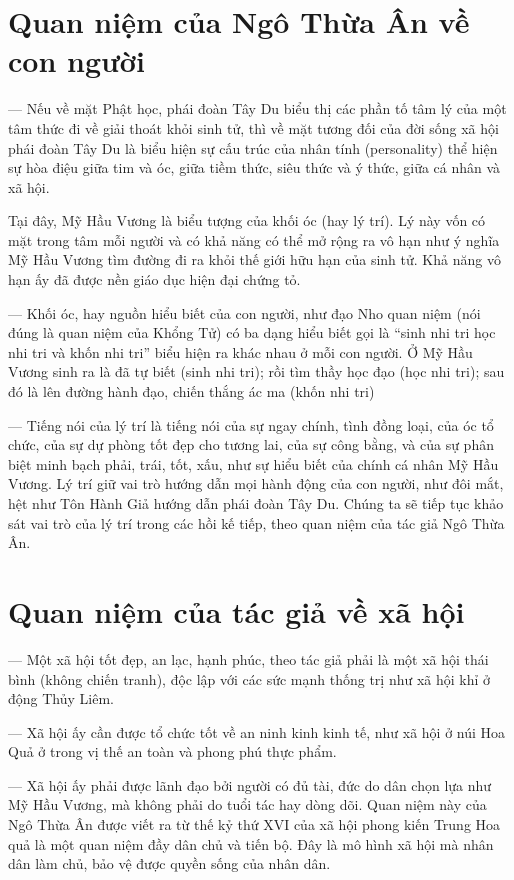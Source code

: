 \section{Quan niệm của Ngô Thừa Ân về con người} %
\label{sec:1_quan_niem_ve_con_nguoi}

— Nếu về mặt Phật học, phái đoàn Tây Du biểu thị các phần tố tâm lý của một tâm thức đi về giải thoát khỏi sinh tử, thì về mặt tương đối của đời sống xã hội phái đoàn Tây Du là biểu hiện sự cấu trúc của nhân tính (personality) thể hiện sự hòa điệu giữa tim và óc, giữa tiềm thức, siêu thức và ý thức, giữa cá nhân và xã hội.

Tại đây, Mỹ Hầu Vương là biểu tượng của khối óc (hay lý trí). Lý này vốn có mặt trong tâm mỗi người và có khả năng có thể mở rộng ra vô hạn như ý nghĩa Mỹ Hầu Vương tìm đường đi ra khỏi thế giới hữu hạn của sinh tử. Khả năng vô hạn ấy đã được nền giáo dục hiện đại chứng tỏ.

— Khối óc, hay nguồn hiểu biết của con người, như đạo Nho quan niệm (nói đúng là quan niệm của Khổng Tử) có ba dạng hiểu biết gọi là ``sinh nhi tri học nhi tri và khốn nhi tri'' biểu hiện ra khác nhau ở mỗi con người. Ở Mỹ Hầu Vương sinh ra là đã tự biết (sinh nhi tri); rồi tìm thầy học đạo (học nhi tri); sau đó là lên đường hành đạo, chiến thắng ác ma (khốn nhi tri)

— Tiếng nói của lý trí là tiếng nói của sự ngay chính, tình đồng loại, của óc tổ chức, của sự dự phòng tốt đẹp cho tương lai, của sự công bằng, và của sự phân biệt minh bạch phải, trái, tốt, xấu, như sự hiểu biết của chính cá nhân Mỹ Hầu Vương. Lý trí giữ vai trò hướng dẫn mọi hành động của con người, như đôi mắt, hệt như Tôn Hành Giả hướng dẫn phái đoàn Tây Du. Chúng ta sẽ tiếp tục khảo sát vai trò của lý trí trong các hồi kế tiếp, theo quan niệm của tác giả Ngô Thừa Ân.


\section{Quan niệm của tác giả về xã hội} %
\label{sec:1_quan_ve_xa_hoi}

— Một xã hội tốt đẹp, an lạc, hạnh phúc, theo tác giả phải là một xã hội thái bình (không chiến tranh), độc lập với các sức mạnh thống trị như xã hội khỉ ở động Thủy Liêm.

— Xã hội ấy cần được tổ chức tốt về an ninh kinh kinh tế, như xã hội ở núi Hoa Quả ở trong vị thế an toàn và phong phú thực phẩm.

— Xã hội ấy phải được lãnh đạo bởi người có đủ tài, đức do dân chọn lựa như Mỹ Hầu Vương, mà không phải do tuổi tác hay dòng dõi. Quan niệm này của Ngô Thừa Ân được viết ra từ thế kỷ thứ XVI của xã hội phong kiến Trung Hoa quả là một quan niệm đầy dân chủ và tiến bộ. Đây là mô hình xã hội mà nhân dân làm chủ, bảo vệ được quyền sống của nhân dân.
